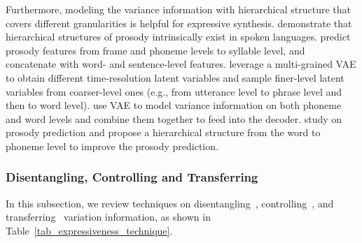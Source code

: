 \documentclass{article}
\begin{document}
Furthermore, modeling the variance information with hierarchical structure that covers different granularities is helpful for expressive synthesis. \citet{suni2017hierarchical} demonstrate that hierarchical structures of prosody intrinsically exist in spoken languages. \citet{kenter2019chive} predict prosody features from frame and phoneme levels to syllable level, and concatenate with word- and sentence-level features. \citet{hono2020hierarchical} leverage a multi-grained VAE to obtain different time-resolution latent variables and sample finer-level latent variables from coarser-level ones (e.g., from utterance level to phrase level and then to word level). \citet{sun2020fully} use VAE to model variance information on both phoneme and word levels and combine them together to feed into the decoder. \citet{chien2021hierarchical} study on prosody prediction and propose a hierarchical structure from the word to phoneme level to improve the prosody prediction.




\subsubsection{Disentangling, Controlling and Transferring}

In this subsection, we review techniques on disentangling~\cite{ma2018neural,hsu2019disentangling,qian2020unsupervised}, controlling~\cite{um2020emotional,lee2021styler,neekhara2021expressive,bae2020speaking,polyak2021speech,tits2021analysis,li2021towards}, and transferring~\cite{karlapati2020copycat,inoue2021model,xue2021cycle,an2021improving} variation information, as shown in Table~\ref{tab_expressiveness_technique}.
\end{document}
